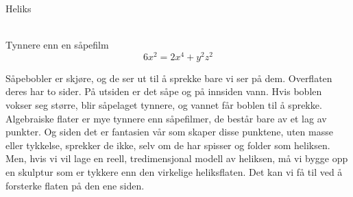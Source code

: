 \documentclass[no]{./../../common/SurferDesc}%
\begin{document}
\footnotesize


\begin{surferPage}
  \begin{surferTitle}Heliks\end{surferTitle}   \\
Tynnere enn en såpefilm\\
  \smallskip
\[6x^2	= 2x^4	+ y^2	z^2\]

\singlespacing
Såpebobler er skjøre, og de ser ut til å sprekke bare vi ser på dem. Overflaten deres har to sider. På utsiden er det såpe og på innsiden vann. Hvis boblen vokser seg større, blir såpelaget tynnere, og vannet får boblen til å sprekke. \\
\vspace{0,3cm}
Algebraiske flater er mye tynnere enn såpefilmer, de består bare av et lag av punkter. Og siden det er fantasien vår som skaper disse punktene, uten masse eller tykkelse, sprekker de ikke, selv om de har spisser og folder som heliksen.\\
\vspace{0,3cm}
Men, hvis vi vil lage en reell, tredimensjonal modell av heliksen, må vi bygge opp en skulptur som er tykkere enn den virkelige heliksflaten. Det kan vi få til ved å forsterke flaten på den ene siden. 

  \begin{surferText}
     \end{surferText}
\end{surferPage}



 
\end{document}

